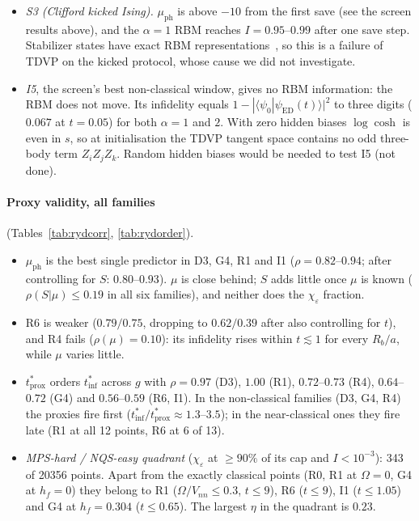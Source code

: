 \documentclass[11pt,a4paper]{article}
\newcommand{\inff}{I}
\newcommand{\tinf}{t^*_{\mathrm{inf}}}
\newcommand{\tprox}{t^*_{\mathrm{prox}}}
\begin{document}
\begin{itemize}
    (at $\pi/2$, $\alpha=4$ fails first): the limitation at $\Omega=0$ is the TDVP integration, not the expressivity.
  \item \emph{S3 (Clifford kicked Ising).} $\mu_{\mathrm{ph}}$ is above $-10$ from the first save (see the screen
    results above), and the $\alpha=1$ RBM reaches $\inff=0.95$--$0.99$ after one save step. Stabilizer states have
    exact RBM representations~\cite{Deng17}, so this is a failure of TDVP on the kicked protocol, whose cause we did
    not investigate.
  \item \emph{I5}, the screen's best non-classical window, gives no RBM information: the RBM does not move. Its
    infidelity equals $1-|\langle\psi_0|\psi_{\mathrm{ED}}(t)\rangle|^2$ to three digits ($0.067$ at $t=0.05$) for
    both $\alpha=1$ and $2$. With zero hidden biases $\log\cosh$ is even in $s$, so at initialisation the TDVP
    tangent space contains no odd three-body term $Z_iZ_jZ_k$. Random hidden biases would be needed to test I5 (not
    done).
\end{itemize}

\paragraph{Proxy validity, all families} (Tables~\ref{tab:rydcorr}, \ref{tab:rydorder}).
\begin{itemize}
  \item $\mu_{\mathrm{ph}}$ is the best single predictor in D3, G4, R1 and I1 ($\rho=0.82$--$0.94$; after
    controlling for $S$: $0.80$--$0.93$). $\mu$ is close behind; $S$ adds little once $\mu$ is known
    ($\rho(S|\mu)\le0.19$ in all six families), and neither does the $\chi_\varepsilon$ fraction.
  \item R6 is weaker ($0.79/0.75$, dropping to $0.62/0.39$ after also controlling for $t$), and R4 fails
    ($\rho(\mu)=0.10$): its infidelity rises within $t\lesssim1$ for every $R_b/a$, while $\mu$ varies little.
  \item $\tprox$ orders $\tinf$ across $g$ with $\rho=0.97$ (D3), $1.00$ (R1), $0.72$--$0.73$ (R4), $0.64$--$0.72$
    (G4) and $0.56$--$0.59$ (R6, I1). In the non-classical families (D3, G4, R4) the proxies fire first
    ($\tinf/\tprox\approx1.3$--$3.5$); in the near-classical ones they fire late (R1 at all 12 points, R6 at 6 of 13).
  \item \emph{MPS-hard / NQS-easy quadrant} ($\chi_\varepsilon$ at $\ge90\%$ of its cap and $\inff<10^{-3}$): 343 of
    20356 points. Apart from the exactly classical points (R0, R1 at $\Omega=0$, G4 at $h_f=0$) they belong to R1
    ($\Omega/V_{nn}\le0.3$, $t\le9$), R6 ($t\le9$), I1 ($t\le1.05$) and G4 at $h_f=0.304$ ($t\le0.65$). The largest
    $\eta$ in the quadrant is $0.23$.
\end{itemize}
\end{document}
